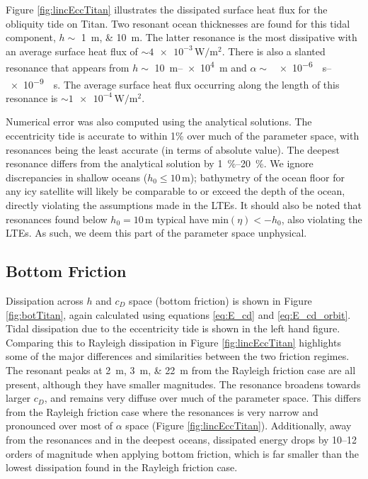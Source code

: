 Figure \ref{fig:lincEccTitan} illustrates the dissipated surface heat flux for the obliquity tide on Titan. Two resonant ocean thicknesses are found for this tidal component, $h \sim$ \SIlist{1;10}{\metre}. The latter resonance is the most dissipative with an average surface heat flux of $\sim \num{4e-3}\, \si{\watt\per\square\metre}$. There is also a slanted resonance that appears from $h \sim$ \SIrange{10}{e4}{\metre} and \hbox{$\alpha \sim$ \SIrange{e-6}{e-9}{\per\second}}. The average surface heat flux occurring along the length of this resonance is $\sim \num{1e-4}\, \si{\watt\per\square\metre}$. 

Numerical error was also computed using the analytical solutions. The eccentricity tide is accurate to within 1\% over much of the parameter space, with resonances being the least accurate (in terms of absolute value). The deepest resonance differs from the analytical solution by \SIrange{1}{20}{\percent}. We ignore discrepancies in shallow oceans ($h_0 \leq 10 \, \si{\metre}$); bathymetry of the ocean floor for any icy satellite will likely be comparable to or exceed the depth of the ocean, directly violating the assumptions made in the LTEs. It should also be noted that resonances found below $h_0 = 10 \, \si{\metre}$ typical have $\text{min} (\eta) < - h_0$, also violating the LTEs. As such, we deem this part of the parameter space unphysical.

\subsection{Bottom Friction \label{subsec:botTitan}}

Dissipation across $h$ and $c_D$ space (bottom friction) is shown in Figure \ref{fig:botTitan}, again calculated using equations \ref{eq:E_cd} and \ref{eq:E_cd_orbit}. Tidal dissipation due to the eccentricity tide is shown in the left hand figure. Comparing this to Rayleigh dissipation in Figure \ref{fig:lincEccTitan} highlights some of the major differences and similarities between the two friction regimes. The resonant peaks at \SIlist{2;3;22}{\metre} from the Rayleigh friction case are all present, although they have smaller magnitudes. The resonance broadens towards larger $c_D$, and remains very diffuse over much of the parameter space. This differs from the Rayleigh friction case where the resonances is very narrow and pronounced over most of $\alpha$ space (Figure \ref{fig:lincEccTitan}). Additionally, away from the resonances and in the deepest oceans, dissipated energy drops by \numrange{10}{12} orders of magnitude when applying bottom friction, which is far smaller than the lowest dissipation found in the Rayleigh friction case.  

